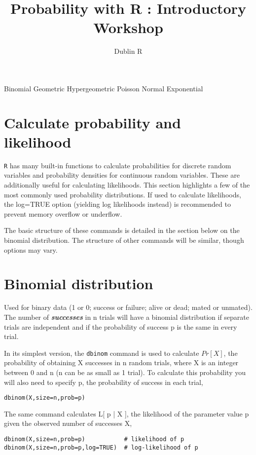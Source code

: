 \documentclass[12pt, a4paper]{article}
\author{ }
\theoremstyle{plain}
\theoremstyle{definition}
\theoremstyle{remark}
\begin{document}
\author{Dublin R}
\title{Probability with R : Introductory Workshop}
\maketitle


\newpage
Binomial
Geometric
Hypergeometric
Poisson
Normal
Exponential

\section{Calculate probability and likelihood}
\texttt{R} has many built-in functions to calculate probabilities for discrete random variables and probability densities for continuous random variables. These are additionally useful for calculating likelihoods. This section highlights a few of the most commonly used probability distributions. If used to calculate likelihoods, the log=TRUE option (yielding log likelihoods instead) is recommended to prevent memory overflow or underflow.

The basic structure of these commands is detailed in the section below on the binomial distribution. The structure of other commands will be similar, though options may vary.

\section{Binomial distribution}
Used for binary data (1 or 0; success or failure; alive or dead; mated or unmated). The number of \textbf{\textit{successes}} in n trials will have a binomial distribution if separate trials are independent and if the probability of success p is the same in every trial.

In its simplest version, the \texttt{dbinom} command is used to calculate $Pr[X]$, the probability of obtaining X successes in n random trials, where X is an integer between 0 and n (n can be as small as 1 trial). To calculate this probability you will also need to specify p, the probability of success in each trial,
\begin{framed}
\begin{verbatim}
dbinom(X,size=n,prob=p)
\end{verbatim}
\end{framed}

The same command calculates L[ p | X ], the likelihood of the parameter value p given the observed number of successes X,

\begin{framed}
\begin{verbatim}
dbinom(X,size=n,prob=p)           # likelihood of p
dbinom(X,size=n,prob=p,log=TRUE)  # log-likelihood of p
\end{verbatim}
\end{framed}
\end{document}
